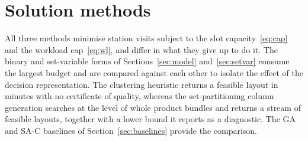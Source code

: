 \documentclass[]{interact}
\begin{document}
\section{Solution methods}\label{sec:methods}
All three methods minimise station visits subject to the slot capacity~\eqref{eq:cap} and the workload cap~\eqref{eq:wl}, and differ in what they give up to do it. The binary and set-variable forms of Sections~\ref{sec:model} and~\ref{sec:setvar} consume the largest budget and are compared against each other to isolate the effect of the decision representation. The clustering heuristic returns a feasible layout in minutes with no certificate of quality, whereas the set-partitioning column generation searches at the level of whole product bundles and returns a stream of feasible layouts, together with a lower bound it reports as a diagnostic. The GA and SA-C baselines of Section~\ref{sec:baselines} provide the comparison.
\end{document}
